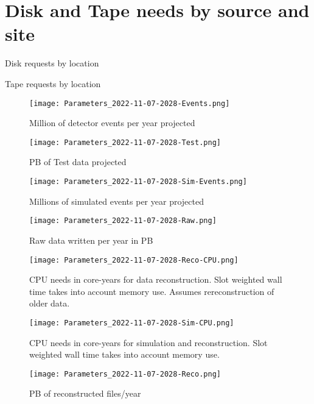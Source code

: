 \documentclass[12pt,landscape]{article}
\begin{document}
\section{Disk and Tape needs by source and site}\begin{table}[h]
\centering{}\label{Cumulative-Disk
}
\caption{Disk requests by location}
\end{table}
\begin{table}[h]
\centering{}\label{Cumulative-Tape
}
\caption{Tape requests by location}
\end{table}
\begin{figure}[ht]
\centering\texttt{[image: Parameters\_2022-11-07-2028-Events.png]}\label{Events}
\caption{Million of detector events per year projected}
\end{figure}
\begin{figure}[ht]
\centering\texttt{[image: Parameters\_2022-11-07-2028-Test.png]}\label{Test}
\caption{PB of Test data projected}
\end{figure}
\begin{figure}[ht]
\centering\texttt{[image: Parameters\_2022-11-07-2028-Sim-Events.png]}\label{Sim-Events}
\caption{Millions of simulated events per year projected}
\end{figure}
\begin{figure}[ht]
\centering\texttt{[image: Parameters\_2022-11-07-2028-Raw.png]}\label{Raw}
\caption{Raw data written per year in PB}
\end{figure}
\begin{figure}[ht]
\centering\texttt{[image: Parameters\_2022-11-07-2028-Reco-CPU.png]}\label{Reco-CPU}
\caption{CPU needs in core-years for data reconstruction.              Slot weighted wall time takes into account memory use.  Assumes rereconstruction of older data.}
\end{figure}
\begin{figure}[ht]
\centering\texttt{[image: Parameters\_2022-11-07-2028-Sim-CPU.png]}\label{Sim-CPU}
\caption{CPU needs in core-years for simulation and reconstruction.              Slot weighted wall time takes into account memory use.}
\end{figure}
\begin{figure}[ht]
\centering\texttt{[image: Parameters\_2022-11-07-2028-Reco.png]}\label{Reco}
\caption{PB of reconstructed files/year}
\end{figure}
\end{document}

